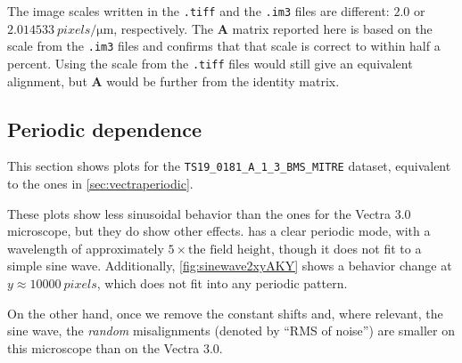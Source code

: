 \documentclass{article}
\newcommand{\matrixbold}[1]{\mathbf{#1}}
\begin{document}
The image scales written in the \texttt{.tiff} and the \texttt{.im3} files are different: $2.0$ or $\SI{2.014533}{pixels\per\micro\meter}$, respectively.  The $\matrixbold{A}$ matrix reported here is based on the scale from the \texttt{.im3} files and confirms that that scale is correct to within half a percent.  Using the scale from the \texttt{.tiff} files would still give an equivalent alignment, but $\matrixbold{A}$ would be further from the identity matrix.

\subsection{Periodic dependence}
\label{sec:akoyapolarisperiodic}

This section shows plots for the \texttt{TS19\_0181\_A\_1\_3\_BMS\_MITRE} dataset, equivalent to the ones in \cref{sec:vectraperiodic}.

These plots show less sinusoidal behavior than the ones for the Vectra 3.0 microscope, but they do show other effects.   has a clear periodic mode, with a wavelength of approximately $5\times\text{the field height}$, though it does not fit to a simple sine wave.  Additionally, \cref{fig:sinewave2xyAKY} shows a behavior change at $y\approx\SI{10000}{pixels}$, which does not fit into any periodic pattern.

On the other hand, once we remove the constant shifts and, where relevant, the sine wave, the \emph{random} misalignments (denoted by ``RMS of noise'') are smaller on this microscope than on the Vectra 3.0.
\end{document}
